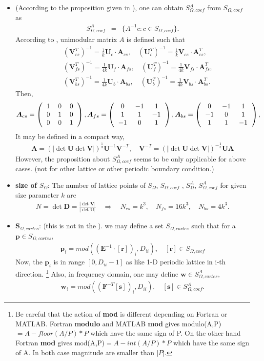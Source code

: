 \documentclass[10pt]{book}
\def\bm{\boldsymbol}
\newcommand{\bea}{\begin{eqnarray}}
\newcommand{\eea}{\end{eqnarray}}
\newcommand{\no}{\nonumber \\}
\def\vr{{\bm r}}
\newcommand{\threedmat}[9]
{\left(\begin{tabular}{ccc} {$#1$}&{$#2$}&{$#3$} \\
		{$#4$}&{$#5$}&{$#6$}\\
		{$#7$}&{$#8$}&{$#9$}\\
	    \end{tabular}\right)}
\begin{document}
\begin{itemize}
  \item  (According to the proposition given in \cite{Zheng}), one can  
       obtain $S^A_{\Omega,coef}$ from $S_{\Omega,coef}$ as
     \bea 
     S^A_{\Omega,coef}&=&\{ A^{-1}c : c\in S_{\Omega,coef} \}.
     \eea         
     According to \cite{Zheng}, unimodular matrix $A$ is defined such that
    \bea 
     & &({\bm V}_{cs}^T)^{-1}=\frac{1}{k}{\bm U}_c\cdot {\bm A}_{cs},\quad 
     ({\bm U}_{c}^T)^{-1}=\frac{1}{k}{\bm V}_{cs}\cdot {\bm A}^T_{cs},\no 
     & & ({\bm V}_{fs}^T)^{-1}=\frac{1}{4k}{\bm U}_f\cdot {\bm A}_{fs},\quad 
     ({\bm U}_{f}^T)^{-1}=\frac{1}{4k}{\bm V}_{fs}\cdot {\bm A}^T_{fs} ,\no 
     & & ({\bm V}_{bs}^T)^{-1}=\frac{1}{4k}{\bm U}_b\cdot {\bm A}_{bs},\quad 
     ({\bm U}_{b}^T)^{-1}=\frac{1}{4k}{\bm V}_{bs}\cdot {\bm A}^T_{bs}.
     \eea  
     Then, 
     \bea 
     {\bm A}_{cs}=\threedmat{1}{0}{0}{0}{1}{0}{0}{0}{1},
     {\bm A}_{fs}=\threedmat{0}{-1}{1}{1}{1}{-1}{-1}{0}{1},
     {\bm A}_{bs}=\threedmat{0}{-1}{1}{-1}{0}{1}{1}{1}{-1},
     \eea                
     It may be defined in a compact way, 
    	\bea 
    	{\bm A}=(|\det{{\bm U}} \det{{\bm V}}|)^{\frac{1}{3}} {\bm U}^{-1}{\bm V}^{-T}, \quad 
    	{\bm V}^{-T}=(|\det{{\bm U}} \det{{\bm V}}|)^{-\frac{1}{3}}{\bm U}{\bm A}
    	\eea 
    {\color{red} However, the proposition about $S^A_{\Omega,coef}$ seems 
    	to be only applicable for above cases.
    (not for other lattice or other periodic boundary condition.)  
    }  
           
   \item {\bf size of $S_\Omega$}: The number of lattice points of $S_\Omega$, $S_{\Omega,coef}$ ,
   $S^A_\Omega$, $S^A_{\Omega,coef}$ for given size parameter $k$ are
   \bea 
   N=\det{\bm D} =\frac{|\det {\bm V}|}{|\det {\bm U}|}\quad\Rightarrow \quad 
   N_{cs}=k^3, \quad N_{fs}=16 k^3,\quad N_{bs}=4 k^3.
   \eea 
   \item ${\bm S}_{\Omega,cartes}$: (this is not in the \cite{Zheng}). 
   we may define a set $S_{\Omega,cartes}$ such that 
   for a ${\bm p}\in S_{\Omega,cartes}$, 
   \bea 
   {\bm p}_i=mod(({\bm E}^{-1}\cdot[\vr])_i,D_{ii} ), \quad [\vr]\in S_{\Omega,coef}
   \eea 
   Now, the ${\bm p}_i$ is in range $[0,D_{ii}-1]$ as like 1-D periodic lattice in i-th direction.
   \footnote{ Be careful that the action of {\bf mod} is different depending on Fortran or MATLAB. 
   	Fortran {\bf modulo} and MATLAB {\bf mod} gives modulo(A,P)$=A-floor(A/P)*P$ which have the same
   	sign of P. 
   	On the other hand Fortran {\bf mod} gives mod(A,P)$=A-int(A/P)*P$ which have the same sign of A. 
   	In both case magnitude are smaller than $|P|$.   
   } 
   Also, in frequency domain, one may define ${\bm w}\in S^A_{\Omega,cartes}$,   
   \bea 
   {\bm w}_i =mod( ({\bm F}^{-T}[{\bm s}] )_i,D_{ii} ), \quad [{\bm s}]\in S^A_{\Omega,coef}.
   \eea 
   

\end{itemize}
\end{document}
